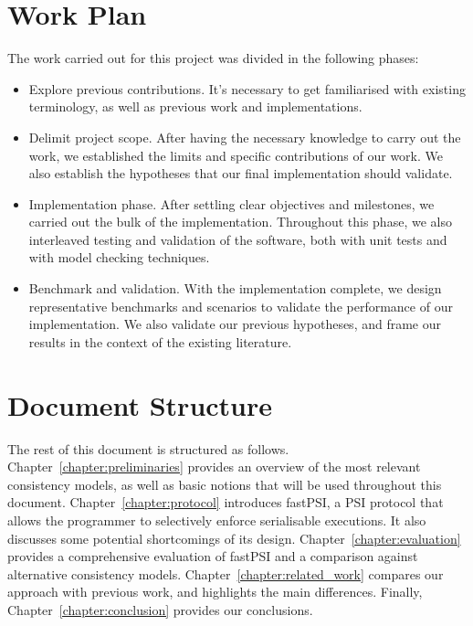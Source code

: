 \section{Work Plan}

The work carried out for this project was divided in the following phases:

\begin{itemize}
    \item Explore previous contributions. It's necessary to get familiarised with existing terminology, as well as previous work and implementations.

    \item Delimit project scope. After having the necessary knowledge to carry out the work, we established the limits and specific contributions of our work. We also establish the hypotheses that our final implementation should validate.

    \item Implementation phase. After settling clear objectives and milestones, we carried out the bulk of the implementation. Throughout this phase, we also interleaved testing and validation of the software, both with unit tests and with model checking techniques.

    \item Benchmark and validation. With the implementation complete, we design representative benchmarks and scenarios to validate the performance of our implementation. We also validate our previous hypotheses, and frame our results in the context of the existing literature.
\end{itemize}

\section{Document Structure}

The rest of this document is structured as follows. Chapter~\ref{chapter:preliminaries} provides an overview of the most relevant consistency models, as well as basic notions that will be used throughout this document. Chapter~\ref{chapter:protocol} introduces fastPSI, a PSI protocol that allows the programmer to selectively enforce serialisable executions. It also discusses some potential shortcomings of its design. Chapter~\ref{chapter:evaluation} provides a comprehensive evaluation of fastPSI and a comparison against alternative consistency models. Chapter~\ref{chapter:related_work} compares our approach with previous work, and highlights the main differences. Finally, Chapter~\ref{chapter:conclusion} provides our conclusions.

